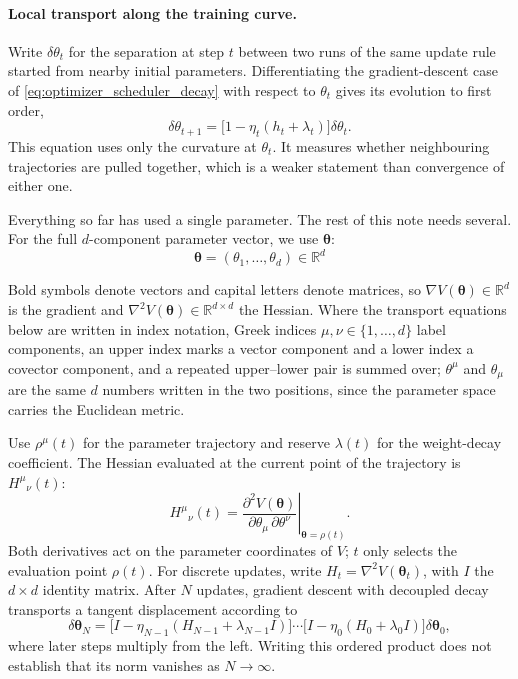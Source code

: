\documentclass[11pt,letterpaper]{article}
\newcommand{\thet}{\bm{\theta}}
\newcommand{\R}{\mathbb{R}}
\begin{document}
\paragraph{Local transport along the training curve.}

Write $\delta\theta_t$ for the separation at step $t$ between two runs of
the same update rule started from nearby initial parameters. Differentiating
the gradient-descent case of \eqref{eq:optimizer_scheduler_decay} with respect
to $\theta_t$ gives its evolution to first order,
\begin{equation}\label{eq:local_tangent}
  \delta\theta_{t+1}
  =\bigl[1-\eta_t(h_t+\lambda_t)\bigr]\delta\theta_t.
\end{equation}
This equation uses only the curvature at $\theta_t$. It measures whether
neighbouring trajectories are pulled together, which is a weaker statement
than convergence of either one.

Everything so far has used a single parameter. The rest of this note needs
several. For the full $d$-component parameter vector, we use $\thet$:
\begin{equation}\label{eq:parameter_vector}
  \thet=(\theta_1,\ldots,\theta_d)\in\R^d
\end{equation}

Bold symbols denote vectors and capital letters
denote matrices, so $\nabla V(\thet)\in\R^d$ is the gradient and
$\nabla^2V(\thet)\in\R^{d\times d}$ the Hessian. Where the transport
equations below are written in index notation, Greek indices
$\mu,\nu\in\{1,\ldots,d\}$ label components, an upper index marks a vector
component and a lower index a covector component, and a repeated
upper--lower pair is summed over; $\theta^\mu$ and $\theta_\mu$ are the same
$d$ numbers written in the two positions, since the parameter space carries
the Euclidean metric.

Use $\rho^\mu(t)$ for the parameter trajectory and reserve $\lambda(t)$ for
the weight-decay coefficient. The Hessian evaluated at the current point of
the trajectory is $H^\mu{}_{\nu}(t)$:
\begin{equation}
  H^\mu{}_{\nu}(t)
  =\left.
    \frac{\partial^2 V(\thet)}
         {\partial\theta_\mu\,\partial\theta^\nu}
    \right|_{\thet=\rho(t)}.
\end{equation}
Both derivatives act on the parameter coordinates of $V$; $t$ only selects
the evaluation point $\rho(t)$.
For discrete updates, write $H_t=\nabla^2V(\thet_t)$, with $I$ the
$d\times d$ identity matrix. After $N$ updates, gradient descent with
decoupled decay transports a tangent displacement according to
\begin{equation}
  \delta\thet_N
  =\bigl[I-\eta_{N-1}(H_{N-1}+\lambda_{N-1}I)\bigr]\cdots
   \bigl[I-\eta_0(H_0+\lambda_0I)\bigr]\delta\thet_0,
\end{equation}
where later steps multiply from the left. Writing this ordered product does
not establish that its norm vanishes as $N\to\infty$.
\end{document}
